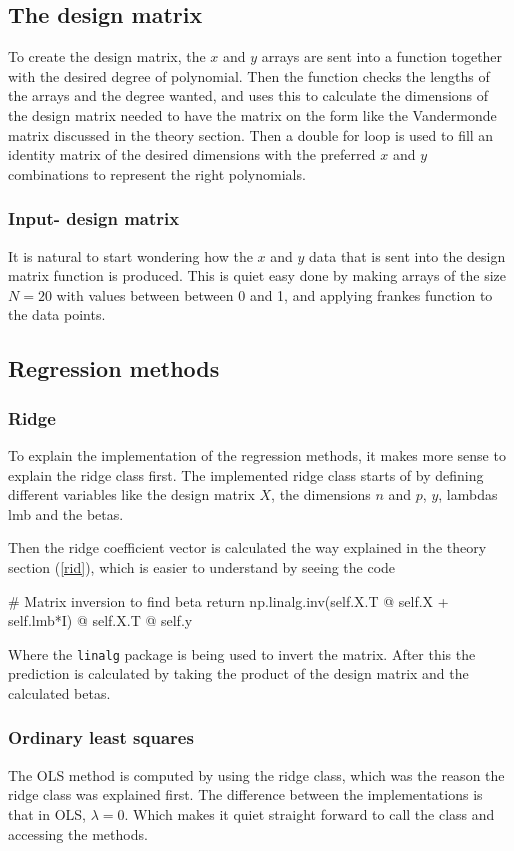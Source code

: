 \documentclass[../main.tex]{subfiles}
\begin{document}
\subsection{The design matrix}
To create the design matrix, the $x$ and $y$ arrays are sent into a function together with the desired degree of polynomial. Then the function checks the lengths of the arrays and the degree wanted, and uses this to calculate the dimensions of the design matrix needed to have the matrix on the form like the Vandermonde matrix discussed in the theory section. Then a double for loop is used to fill an identity matrix of the desired dimensions with the preferred $x$ and $y$ combinations to represent the right polynomials.

\subsubsection{Input- design matrix}
It is natural to start wondering how the $x$ and $y$ data that is sent into the design matrix function is produced. This is quiet easy done by making arrays of the size $N=20$ with values between between 0 and 1, and applying frankes function to the data points.

\subsection{Regression methods}
\subsubsection{Ridge}
To explain the implementation of the regression methods, it makes more sense to explain the ridge class first. The implemented ridge class starts of by defining different variables like the design matrix $X$, the dimensions $n$ and $p$, $y$, lambdas lmb and the betas.

Then the ridge coefficient vector is calculated the way explained in the theory section (\ref{rid}), which is easier to understand by seeing the code
\begin{python}
        # Matrix inversion to find beta
        return np.linalg.inv(self.X.T @ self.X + self.lmb*I) @ self.X.T @ self.y
\end{python}
Where the \verb|linalg| package is being used to invert the matrix. After this the prediction is calculated by taking the product of the design matrix and the calculated betas.

\subsubsection{Ordinary least squares}
The OLS method is computed by using the ridge class, which was the reason the ridge class was explained first. The difference between the implementations is that in OLS, $\lambda=0$. Which makes it quiet straight forward to call the class and accessing the methods.
\end{document}
